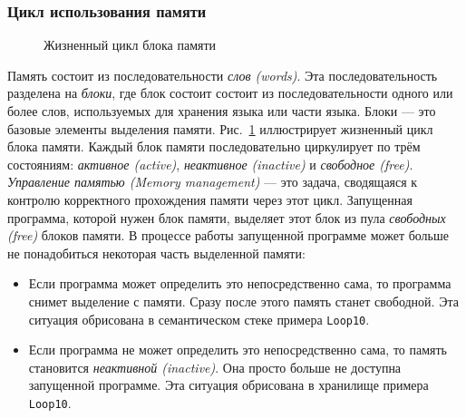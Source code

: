 \subsubsection{Цикл использования памяти}

\begin{figure}
\caption{Жизненный цикл блока памяти}
\label{figure:memory_use_cycle}
\end{figure}

Память состоит из последовательности \emph{слов (words)}. Эта последовательность разделена на \emph{блоки}, где блок состоит состоит из последовательности одного или более слов, используемых для хранения языка или части языка. Блоки --- это базовые элементы выделения памяти. Рис.~\ref{figure:memory_use_cycle} иллюстрирует жизненный цикл блока памяти. Каждый блок памяти последовательно циркулирует по трём состояниям: \emph{активное (active)}, \emph{неактивное (inactive)} и \emph{свободное (free)}. \emph{Управление памятью (Memory management)} --- это задача, сводящаяся к контролю корректного прохождения памяти через этот цикл. Запущенная программа, которой нужен блок памяти, выделяет этот блок из пула \emph{свободных (free)} блоков памяти. В процессе работы запущенной программе может больше не понадобиться некоторая часть выделенной памяти:

\begin{itemize}
\item{Если программа может определить это непосредственно сама, то программа снимет выделение с памяти. Сразу после этого память станет свободной. Эта ситуация обрисована в семантическом стеке примера \lstinline|Loop10|.}

\item{Если программа не может определить это непосредственно сама, то память становится \emph{неактивной (inactive)}. Она просто больше не доступна запущенной программе. Эта ситуация обрисована в хранилище примера \lstinline|Loop10|.}
\end{itemize}

